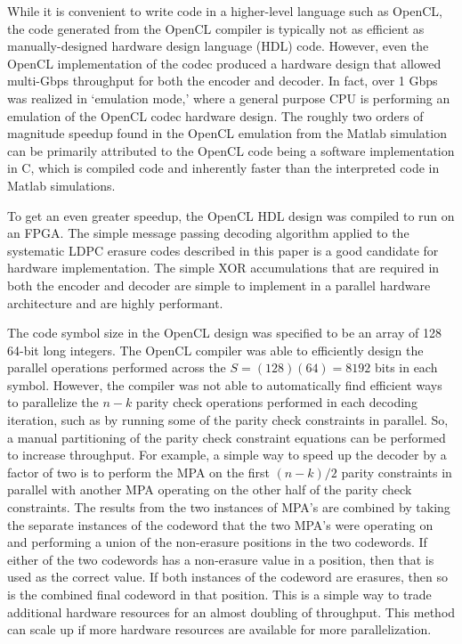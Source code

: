 \documentclass[conference]{IEEEtran}
\begin{document}
While it is convenient to write code in a higher-level language such as OpenCL, the code generated from the OpenCL compiler is typically not as efficient as manually-designed hardware design language (HDL) code.  However, even the OpenCL implementation of the codec produced a hardware design that allowed multi-Gbps throughput for both the encoder and decoder.  In fact, over 1 Gbps was realized in `emulation mode,' where a general purpose CPU is performing an emulation of the OpenCL codec hardware design.  The roughly two orders of magnitude speedup found in the OpenCL emulation from the Matlab simulation can be primarily attributed to the OpenCL code being a software implementation in C, which is compiled code and inherently faster than the interpreted code in Matlab simulations.

To get an even greater speedup, the OpenCL HDL design was compiled to run on an FPGA.  The simple message passing decoding algorithm applied to the systematic LDPC erasure codes described in this paper is a good candidate for hardware implementation.  The simple XOR accumulations that are required in both the encoder and decoder are simple to implement in a parallel hardware architecture and are highly performant. 

The code symbol size in the OpenCL design was specified to be an array of 128 64-bit long integers.  The OpenCL compiler was able to efficiently design the parallel operations performed across the $S=(128)(64)=8192$ bits in each symbol. However, the compiler was not able to automatically find efficient ways to parallelize the $n-k$ parity check operations performed in each decoding iteration, such as by running some of the parity check constraints in parallel.  So, a manual partitioning of the parity check constraint equations can be performed to increase throughput.  For example, a simple way to speed up the decoder by a factor of two is to perform the MPA on the first $({n-k})/{2}$ parity constraints in parallel with another MPA operating on the other half of the parity check constraints.  The results from the two instances of MPA's are combined by taking the separate instances of the codeword that the two MPA's were operating on and performing a union of the non-erasure positions in the two codewords.  If either of the two codewords has a non-erasure value in a position, then that is used as the correct value.  If both instances of the codeword are erasures, then so is the combined final codeword in that position.  This is a simple way to trade additional hardware resources for an almost doubling of throughput.  This method can scale up if more hardware resources are available for more parallelization.
\end{document}
